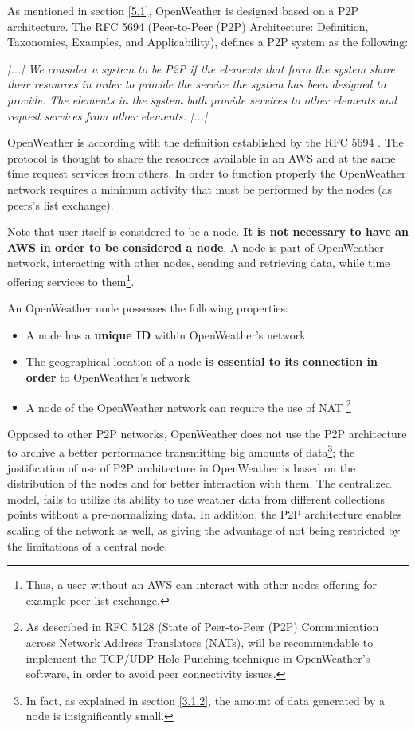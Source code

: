 As mentioned in section \ref{5.1}, OpenWeather is designed based on a \gls{P2P} architecture. The \gls{RFC} 5694 (Peer-to-Peer (P2P) Architecture: Definition, Taxonomies, Examples, and Applicability)\cite{rfc5694}, defines a \gls{P2P} system as the following:

\emph{[...] We consider a system to be P2P if the elements that form the system
   share their resources in order to provide the service the system has
   been designed to provide.  The elements in the system both provide
   services to other elements and request services from other elements. [...]}

OpenWeather is according with the definition established by the \gls{RFC} 5694 \cite{rfc5694}. The protocol is thought to share the resources available in an \gls{AWS} and at the same time request services from others. In order to function properly the OpenWeather network requires a minimum activity that must be performed by the nodes (as peers's list exchange).

Note that user itself is considered to be a node. \textbf{It is not necessary to have an \gls{AWS} in order to be considered a node}. A node is part of OpenWeather network, interacting with other nodes, sending and retrieving data, while time offering services to them\footnote{Thus, a user without an \gls{AWS} can interact with other nodes offering for example peer list exchange.}. 

An OpenWeather node possesses the following properties:

\begin{itemize}
\item A node has a \textbf{unique ID} within OpenWeather's network
\item The geographical location of a node \textbf{is essential to its connection in order} to OpenWeather's network
\item A node of the OpenWeather network can require the use of \gls{NAT}\cite{rfc1631} \footnote{As described in \gls{RFC} 5128 (State of Peer-to-Peer (P2P) Communication across Network Address Translators (NATs)\cite{rfc5128}, will be recommendable to implement the TCP/UDP Hole Punching technique in OpenWeather's software, in order to avoid peer connectivity issues.}
\end{itemize}

Opposed to other \gls{P2P} networks, OpenWeather does not use the \gls{P2P} architecture to archive a better performance transmitting big amounts of data\footnote{In fact, as explained in section \ref{3.1.2}, the amount of data generated by a node is insignificantly small.}; the justification of use of \gls{P2P} architecture in OpenWeather is based on the distribution of the nodes and for better interaction with them. The centralized model, fails to utilize its ability to use weather data from different collections points without a pre-normalizing data. In addition, the \gls{P2P} architecture enables scaling of the network as well, as giving the advantage of not being restricted by the limitations of a central node.


